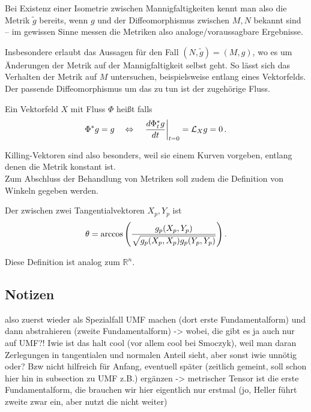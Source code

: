 \documentclass[../H_Analysis_main.tex]{subfiles}
\begin{document}
Bei Existenz einer Isometrie zwischen Mannigfaltigkeiten kennt man also die Metrik $\tilde{g}$ bereits, wenn $g$ und der Diffeomorphismus zwischen $M, N$ bekannt sind -- im gewissen Sinne messen die Metriken also analoge/voraussagbare Ergebnisse.


Insbesondere erlaubt das Aussagen für den Fall $(N, \tilde{g}) = (M, g)$, wo es um Änderungen der Metrik auf der Mannigfaltigkeit selbst geht. So lässt sich das Verhalten der Metrik auf $M$ untersuchen, beispielsweise entlang eines Vektorfelds. Der passende Diffeomorphismus um das zu tun ist der zugehörige Fluss.

\begin{defi}
Ein Vektorfeld $X$ mit Fluss $\Phi$ heißt  falls
\begin{equation}
\Phi^* g = g \quad \Leftrightarrow \quad \eval{\dv{\Phi_t^* g}{t}}_{t = 0} = \mathcal{L}_X g = 0 \, .
\end{equation}
\end{defi}

Killing-Vektoren sind also besonders, weil sie einem Kurven vorgeben, entlang denen die Metrik konstant ist.\\



Zum Abschluss der Behandlung von Metriken soll zudem die Definition von Winkeln gegeben werden.
\begin{defi}[Winkel]
Der  zwischen zwei Tangentialvektoren $X_p, Y_p$ ist
\begin{equation}
\theta = \arccos\qty(\frac{g_p(X_p, Y_p)}{\sqrt{g_p(X_p, X_p) g_p(Y_p, Y_p)}}) \, .
\end{equation}
\end{defi}

Diese Definition ist analog zum $\mathbb{R}^n$.



		\subsection{Notizen}
also zuerst wieder als Spezialfall UMF machen (dort erste Fundamentalform) und dann abstrahieren (zweite Fundamentalform) -> wobei, die gibt es ja auch nur auf UMF?! Iwie ist das halt cool (vor allem cool bei Smoczyk), weil man daran Zerlegungen in tangentialen und normalen Anteil sieht, aber sonst iwie unnötig oder? Bzw nicht hilfreich für Anfang, eventuell später (zeitlich gemeint, soll schon hier hin in subsection zu UMF z.B.) ergänzen -> metrischer Tensor ist die erste Fundamentalform, die brauchen wir hier eigentlich nur erstmal (jo, Heller führt zweite zwar ein, aber nutzt die nicht weiter)
\end{document}
